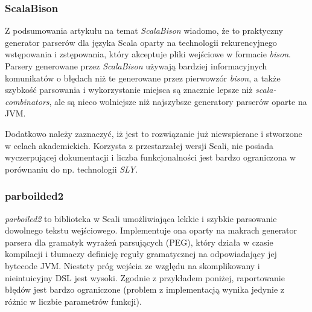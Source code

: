 \subsubsection{ScalaBison}
\label{sec:scala-bison}

Z podsumowania artykułu na temat \textit{ScalaBison}\cite{boyland2010tool} wiadomo, że to praktyczny generator parserów dla języka Scala oparty na technologii rekurencyjnego wstępowania i zstępowania, który akceptuje pliki wejściowe w formacie \textit{bison}. Parsery generowane przez \textit{ScalaBison} używają bardziej informacyjnych komunikatów o błędach niż te generowane przez pierwowzór \textit{bison}, a także szybkość parsowania i wykorzystanie miejsca są znacznie lepsze niż \textit{scala-combinators}, ale są nieco wolniejsze niż najszybsze generatory parserów oparte na JVM.

Dodatkowo należy zaznaczyć, iż jest to rozwiązanie już niewspierane i stworzone w celach akademickich. Korzysta z przestarzałej wersji Scali, nie posiada wyczerpującej dokumentacji i liczba funkcjonalności jest bardzo ograniczona w porównaniu do np. technologii \textit{SLY}.

\subsubsection{parboilded2}
\label{subsec:parboiled-2}

\textit{parboiled2}\cite{myltsev2019parboiled2} to biblioteka w Scali umożliwiająca lekkie i szybkie parsowanie dowolnego tekstu wejściowego. Implementuje ona oparty na makrach generator parsera dla gramatyk wyrażeń parsujących (PEG), który działa w czasie kompilacji i tłumaczy definicję reguły gramatycznej na odpowiadający jej bytecode JVM. Niestety próg wejścia ze względu na skomplikowany i nieintuicyjny DSL jest wysoki. Zgodnie z przykładem poniżej, raportowanie błędów jest bardzo ograniczone (problem z implementacją wynika jedynie z różnic w liczbie parametrów funkcji).

